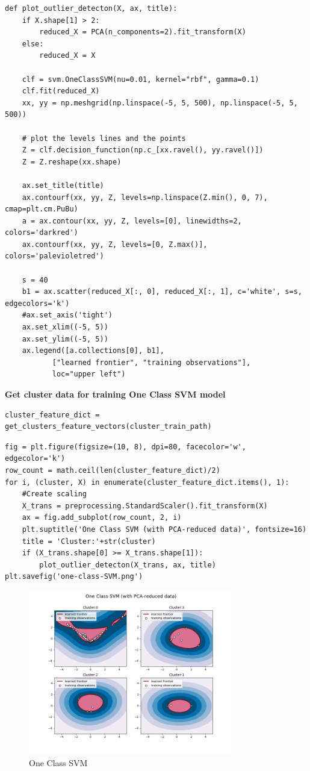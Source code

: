 \documentclass{article}
\begin{document}
\begin{verbatim}
def plot_outlier_detecton(X, ax, title):
    if X.shape[1] > 2:
        reduced_X = PCA(n_components=2).fit_transform(X)
    else:
        reduced_X = X

    clf = svm.OneClassSVM(nu=0.01, kernel="rbf", gamma=0.1)
    clf.fit(reduced_X)
    xx, yy = np.meshgrid(np.linspace(-5, 5, 500), np.linspace(-5, 5, 500))

    # plot the levels lines and the points
    Z = clf.decision_function(np.c_[xx.ravel(), yy.ravel()])
    Z = Z.reshape(xx.shape)

    ax.set_title(title)
    ax.contourf(xx, yy, Z, levels=np.linspace(Z.min(), 0, 7), cmap=plt.cm.PuBu)
    a = ax.contour(xx, yy, Z, levels=[0], linewidths=2, colors='darkred')
    ax.contourf(xx, yy, Z, levels=[0, Z.max()], colors='palevioletred')

    s = 40
    b1 = ax.scatter(reduced_X[:, 0], reduced_X[:, 1], c='white', s=s, edgecolors='k')
    #ax.set_axis('tight')
    ax.set_xlim((-5, 5))
    ax.set_ylim((-5, 5))
    ax.legend([a.collections[0], b1],
           ["learned frontier", "training observations"],
           loc="upper left")
\end{verbatim}
\textbf{Get cluster data for training One Class SVM model}
\begin{verbatim}
cluster_feature_dict = get_clusters_feature_vectors(cluster_train_path)
\end{verbatim}
\textbf{\Large{}}
\begin{verbatim}
fig = plt.figure(figsize=(10, 8), dpi=80, facecolor='w', edgecolor='k')
row_count = math.ceil(len(cluster_feature_dict)/2)
for i, (cluster, X) in enumerate(cluster_feature_dict.items(), 1):
    #Create scaling
    X_trans = preprocessing.StandardScaler().fit_transform(X)
    ax = fig.add_subplot(row_count, 2, i)
    plt.suptitle('One Class SVM (with PCA-reduced data)', fontsize=16)
    title = 'Cluster:'+str(cluster)
    if (X_trans.shape[0] >= X_trans.shape[1]):
        plot_outlier_detecton(X_trans, ax, title)
plt.savefig('one-class-SVM.png')
\end{verbatim}

\begin{figure}[H]
\centering
\includegraphics[width=0.80\textwidth]{one-class-SVM.png}
\caption{One Class SVM} \label{fig:one-class-SVM-in-program}
\end{figure}
\end{document}
